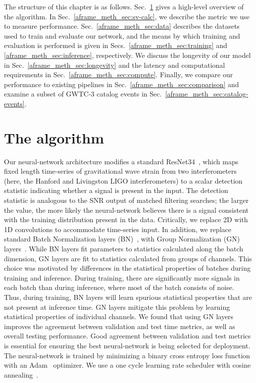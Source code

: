 \begin{refsection}
The structure of this chapter is as follows. 
Sec.~\ref{aframe_meth_sec:aframe-overview} gives a high-level overview of the \aframe algorithm. 
In Sec.~\ref{aframe_meth_sec:sv-calc}, we describe the metric we use to measure performance. 
Sec.~\ref{aframe_meth_sec:data} describes the datasets used to train and evaluate our network, and the means by which training and evaluation is performed is given in Secs.~\ref{aframe_meth_sec:training} and \ref{aframe_meth_sec:inference}, respectively. 
We discuss the longevity of our model in Sec.~\ref{aframe_meth_sec:longevity} and the latency and computational requirements in Sec.~\ref{aframe_meth_sec:compute}. 
Finally, we compare our performance to existing pipelines in Sec.~\ref{aframe_meth_sec:comparison} and examine a subset of GWTC-3 catalog events in Sec.~\ref{aframe_meth_sec:catalog-events}.



\section{The \aframe algorithm} \label{aframe_meth_sec:aframe-overview}

Our neural-network architecture modifies a standard ResNet34~\cite{resnet}, which maps fixed length time-series of gravitational wave strain from two interferometers (here, the Hanford and Livingston LIGO interferometers) to a scalar detection statistic indicating whether a signal is present in the input. 
The detection statistic is analogous to the SNR output of matched filtering searches; the larger the value, the more likely the neural-network believes there is a signal consistent with the training distribution present in the data. 
Critically, we replace 2D with 1D convolutions to accommodate time-series input. 
In addition, we replace standard Batch Normalization layers (BN)~\cite{ioffe2015batch}, with Group Normalization (GN) layers~\cite{Wu_2018_ECCV}. 
While BN layers fit parameters to statistics calculated along the batch dimension, GN layers are fit to statistics calculated from groups of channels. 
This choice was motivated by differences in the statistical properties of batches during training and inference. During training, there are significantly more signals in each batch than during inference, where most of the batch consists of noise. 
Thus, during training, BN layers will learn spurious statistical properties that are not present at inference time. 
GN layers mitigate this problem by learning statistical properties of individual channels. 
We found that using GN layers improves the agreement between validation and test time metrics, as well as overall testing performance. 
Good agreement between validation and test metrics is essential for ensuring the best neural-network is being selected for deployment. 
The neural-network is trained by minimizing a binary cross entropy loss function with an Adam~\cite{AdamOptimizer} optimizer.
We use a one cycle learning rate scheduler with cosine annealing~\cite{onecycleLR}. 


\end{refsection}
